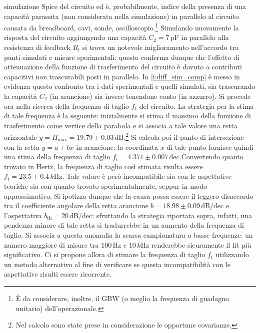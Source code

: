 \documentclass[a4paper,11pt]{article} %
\begin{document}
\noindent simulazione Spice del circuito ed è, probabilmente, indice della presenza di una capacità parassita (non
considerata nella simulazione) in parallelo al circuito causata da breadboard, cavi, sonde, oscilloscopio.\footnote{È da
considerare, inoltre, il GBW (o meglio la frequenza di guadagno unitario) dell'operazionale.} Simulando nuovamente la
risposta del circuito aggiungendo una capacità $C_{2}=7\,\si{\pF}$ in parallelo alla resistenza di feedback
$R_{\text{f}}$ si trova un notevole miglioramento nell'accordo tra punti simulati e misure sperimentali: questo conferma
dunque che l'effetto di attenuazione della funzione di trasferimento del circuito è dovuto a contributi capacitivi non
trascurabili posti in parallelo. In \autoref{i:diff_sim_comp} è messo in evidenza questo confronto tra i dati
sperimentali e quelli simulati, sia trascurando la capacità $C_{2}$ (in arancione) sia invece tenendone conto (in
azzurro). Si procede ora nella ricerca della frequenza di taglio $f_{\text{t}}$ del circuito. La strategia per la stima
di tale frequenza è la seguente: inizialmente si stima il massimo della funzione di trasferimento come vertice della
parabola e si associa a tale valore una retta orizzontale $y=H_{\text{max}}=19.79\pm
0.03\,\text{dB}$.\footnote{Nel calcolo sono state prese in considerazione le opportune covarianze.\label{refnote}} Si
calcola poi il punto di intersezione con la retta $y=a+bx$ in arancione: la coordinata $x$ di tale punto fornisce quindi
una stima della frequenza di taglio $f_{\text{t}}=4.371 \pm 0.007\,\text{dec}$.\footnotemark[4] Convertendo
quanto trovato in Hertz, la frequenza di taglio così stimata risulta essere $f_{\text{t}}=23.5 \pm 0.4\,\si{k\Hz}$. Tale
valore è però incompatibile sia con le aspettative teoriche sia con quanto trovato sperimentalmente, seppur in modo
approssimativo. Si ipotizza dunque che la causa possa essere il leggero disaccordo tra il coefficiente angolare della
retta arancione $b = 18.98\pm 0.09\,\text{dB/dec}$ e l'aspettativa $b_{\text{th}}=20\,\text{dB/dec}$: sfruttando la
strategia riportata sopra, infatti, una pendenza minore di tale retta si tradurrebbe in un aumento della frequenza di
taglio. Si associa a questa anomalia la scarsa campionatura a basse frequenze: un numero maggiore di misure tra
$100\,\si{\Hz}$ e $10\,\si{k\Hz}$ renderebbe sicuramente il fit più significativo. Ci si propone allora di stimare la
frequenza di taglio $f_{\text{t}}$ utilizzando un metodo alternativo al fine di verificare se questa incompatibilità con
le aspettative risulti essere ricorrente.
\end{document}
